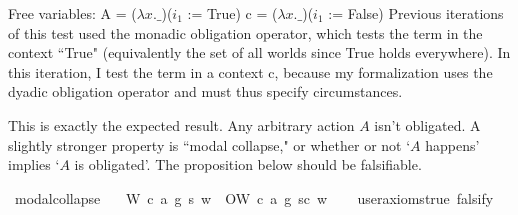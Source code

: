 \begin{isabellebody}
{  Free variables:
    A = ($\lambda x. \_$)($i_1$ := True)
    c = ($\lambda x. \_$)($i_1$ := False) \color{blue}
Previous iterations of this test used the monadic obligation operator, which tests the term in the 
context ``True" (equivalently the set of all worlds since True holds everywhere). In this iteration, 
I test the term in a context c, because my formalization uses the dyadic obligation operator and must 
thus specify circumstances.%
}%
\endisatagproof
{\isafoldproof}%
%
\isadelimproof
%
\endisadelimproof
%
\begin{isamarkuptext}%
This is exactly the expected result. Any arbitrary action $A$ isn't obligated. A slightly 
        stronger property is ``modal collapse," or whether or not `$A$ happens' implies `$A$ is obligated'. 
The proposition below should be falsifiable.%
\end{isamarkuptext}\isamarkuptrue%
\isamarkupfalse%
\ modal{\isacharunderscore}collapse{\isacharcolon}\isanewline
\ \ \ {\isachardoublequoteopen}{\isacharparenleft}{\isacharparenleft}W\ {\isacharparenleft}c{\isacharcomma}\ a{\isacharcomma}\ g{\isacharparenright}\ s{\isacharparenright}\ w{\isacharparenright}\ {\isasymlongrightarrow}\ O{\isacharbraceleft}W\ {\isacharparenleft}c{\isacharcomma}\ a{\isacharcomma}\ g{\isacharparenright}\ s{\isacharbar}c{\isacharbraceright}\ w{\isachardoublequoteclose}\isanewline
\ \ \isamarkupfalse%
\ {\isacharbrackleft}user{\isacharunderscore}axioms{\isacharequal}true{\isacharcomma}\ falsify{\isacharbrackright}%
\isadelimproof
\ %
\endisadelimproof
%
\isatagproof
{}\isamarkupfalse%
\isanewline
%
\end{isabellebody}
